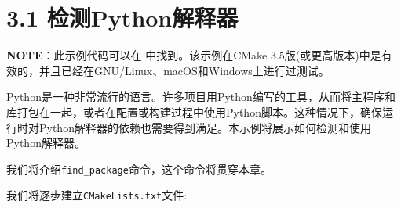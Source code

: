 \section{3.1 检测Python解释器}

\begin{myInfoBox}
\textbf{NOTE}：此示例代码可以在  中找到。该示例在CMake 3.5版(或更高版本)中是有效的，并且已经在GNU/Linux、macOS和Windows上进行过测试。
\end{myInfoBox}

Python是一种非常流行的语言。许多项目用Python编写的工具，从而将主程序和库打包在一起，或者在配置或构建过程中使用Python脚本。这种情况下，确保运行时对Python解释器的依赖也需要得到满足。本示例将展示如何检测和使用Python解释器。

我们将介绍\texttt{find\_package}命令，这个命令将贯穿本章。


我们将逐步建立\texttt{CMakeLists.txt}文件:

